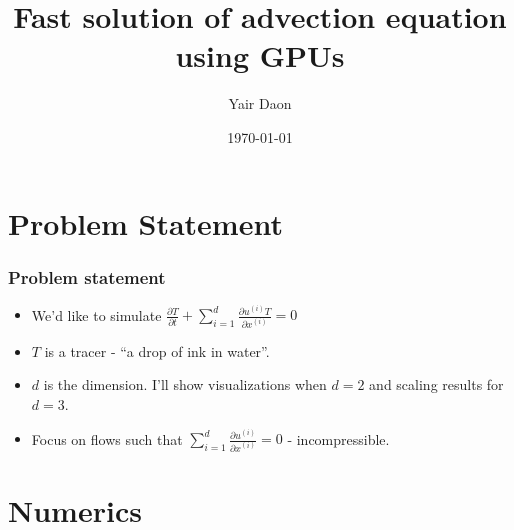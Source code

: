 \documentclass[]{beamer}
\title{Fast solution of advection equation using GPUs}    %
\author{Yair Daon}                 %
\institute{Courant Institute}      %
\date{\today}                    %
\begin{document}
\begin{frame}
  \titlepage
\end{frame}

\section{Problem Statement}
\begin{frame}
  \frametitle{Problem statement}   %

  \begin{itemize}
  \item We'd like to simulate $\frac{\partial T}{\partial t} + \sum_{i=1}^{d} \frac{\partial u^{(i)}T}{\partial x^{(i)}} = 0$ 
  \item $T$ is a tracer - ``a drop of ink in water''.
  \item $d$ is the dimension. I'll show visualizations when $d=2$ and scaling results for $d=3$.
  \item Focus on flows such that $\sum_{i=1}^{d} \frac{\partial u^{(i)}}{\partial x^{(i)}} = 0$ - incompressible.
  \end{itemize}
\end{frame}



\begin{frame}
  \tableofcontents
\end{frame}


\section{Numerics}
\end{document}
